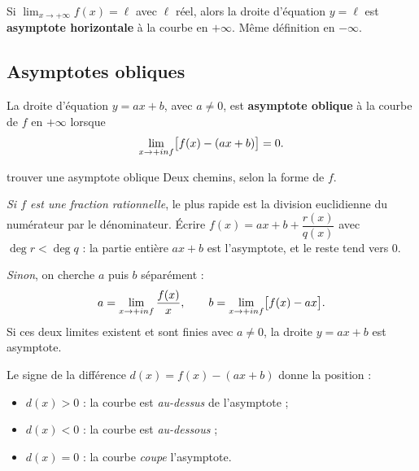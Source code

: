 \begin{definition}
Si $\displaystyle\lim_{x \to +\infty} f(x) = \ell$ avec $\ell$ réel, alors la
droite d'équation $y = \ell$ est \textbf{asymptote horizontale} à la courbe en
$+\infty$. Même définition en $-\infty$.
\end{definition}

\subsection{Asymptotes obliques}

\begin{definition}
La droite d'équation $y = ax+b$, avec $a \neq 0$, est \textbf{asymptote
oblique} à la courbe de $f$ en $+\infty$ lorsque
\[
  \limpinf \bigl[f(x) - (ax+b)\bigr] = 0 .
\]
\end{definition}

\begin{methode}{trouver une asymptote oblique}
Deux chemins, selon la forme de $f$.

\smallskip
\emph{Si $f$ est une fraction rationnelle}, le plus rapide est la division
euclidienne du numérateur par le dénominateur. Écrire
$f(x) = ax+b+\dfrac{r(x)}{q(x)}$ avec $\deg r < \deg q$ : la partie entière
$ax+b$ est l'asymptote, et le reste tend vers $0$.

\smallskip
\emph{Sinon}, on cherche $a$ puis $b$ séparément :
\[
  a = \limpinf \frac{f(x)}{x}, \qquad b = \limpinf \bigl[f(x)-ax\bigr].
\]
Si ces deux limites existent et sont finies avec $a \neq 0$, la droite
$y = ax+b$ est asymptote.
\end{methode}

\begin{propriete}
Le signe de la différence $d(x) = f(x)-(ax+b)$ donne la position :
\begin{itemize}[leftmargin=1.4em, itemsep=0.15em]
  \item $d(x) > 0$ : la courbe est \emph{au-dessus} de l'asymptote ;
  \item $d(x) < 0$ : la courbe est \emph{au-dessous} ;
  \item $d(x) = 0$ : la courbe \emph{coupe} l'asymptote.
\end{itemize}
\end{propriete}

